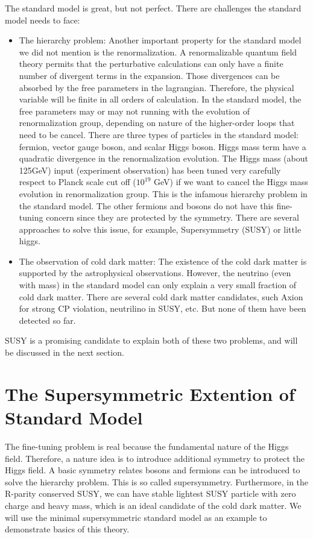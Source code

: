 The standard model is great, but not perfect. There are challenges the standard model needs to face:
\begin{itemize}
\item The hierarchy problem: Another important property for the standard model we did not mention is the renormalization. A renormalizable quantum field theory permits that the perturbative calculations can only have a finite number of divergent terms in the expansion. Those divergences can be absorbed by the free parameters in the lagrangian. Therefore, the physical variable will be finite in all orders of calculation. In the standard model, the free parameters may or may not running with the evolution of renormalization group, depending on nature of the higher-order loops that need to be cancel. There are three types of particles in the standard model: fermion, vector gauge boson, and scalar Higgs boson. Higgs mass term have a quadratic divergence in the renormalization evolution. The Higgs mass (about 125GeV) input (experiment observation) has been tuned very carefully respect to Planck scale cut off ($10^{19}$ GeV) if we want to cancel the Higgs mass evolution in renormalization group. This is the infamous hierarchy problem in the standard model. The other fermions and bosons do not have this fine-tuning concern since they are protected by the symmetry. There are several approaches to solve this issue, for example, Supersymmetry (SUSY) or little higgs\cite{Schmaltz:2005ky}. 
\item The observation of cold dark matter: The existence of the cold dark matter is supported by the astrophysical observations. However, the neutrino (even with mass) in the standard model can only explain a very small fraction of cold dark matter. There are several cold dark matter candidates, such Axion for strong CP violation, neutrilino in SUSY, etc. But none of them have been detected so far.
\end{itemize}

SUSY is a promising candidate to explain both of these two problems, and will be discussed in the next section. 

\clearpage
\section{The Supersymmetric Extention of Standard Model}
The fine-tuning problem is real because the fundamental nature of the Higgs field. Therefore, a nature idea is to introduce additional symmetry to protect the Higgs field. A basic symmetry relates bosons and fermions can be introduced to solve the hierarchy problem. This is so called supersymmetry. Furthermore, in the R-parity conserved SUSY, we can have stable lightest SUSY particle with zero charge and heavy mass, which is an ideal candidate of the cold dark matter. We will use the minimal supersymmetric standard model as an example to demonstrate basics of this theory. 


